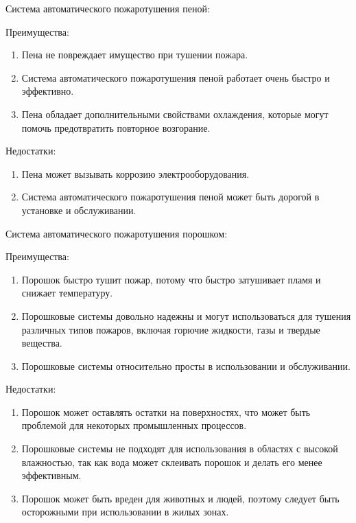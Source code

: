 \begin{multicols}{2}
Система автоматического пожаротушения пеной:

Преимущества:

\begin{enumerate}
\def\labelenumi{\arabic{enumi}.}
\item
  Пена не повреждает имущество при тушении пожара.
\item
  Система автоматического пожаротушения пеной работает очень быстро и
  эффективно.
\item
  Пена обладает дополнительными свойствами охлаждения, которые могут
  помочь предотвратить повторное возгорание.
\end{enumerate}

Недостатки:

\begin{enumerate}
\def\labelenumi{\arabic{enumi}.}
\item
  Пена может вызывать коррозию электрооборудования.
\item
  Система автоматического пожаротушения пеной может быть дорогой в
  установке и обслуживании.
\end{enumerate}

Система автоматического пожаротушения порошком:

Преимущества:

\begin{enumerate}
\def\labelenumi{\arabic{enumi}.}
\item
  Порошок быстро тушит пожар, потому что быстро затушивает пламя и
  снижает температуру.
\item
  Порошковые системы довольно надежны и могут использоваться для тушения
  различных типов пожаров, включая горючие жидкости, газы и твердые
  вещества.
\item
  Порошковые системы относительно просты в использовании и обслуживании.
\end{enumerate}

Недостатки:

\begin{enumerate}
\def\labelenumi{\arabic{enumi}.}
\item
  Порошок может оставлять остатки на поверхностях, что может быть
  проблемой для некоторых промышленных процессов.
\item
  Порошковые системы не подходят для использования в областях с высокой
  влажностью, так как вода может склеивать порошок и делать его менее
  эффективным.
\item
  Порошок может быть вреден для животных и людей, поэтому следует быть
  осторожными при использовании в жилых зонах.
\end{enumerate}


\end{multicols}
